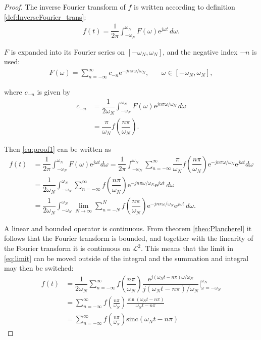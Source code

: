 \begin{proof}
The inverse Fourier transform of $f$ is written according to definition \ref{def:InverseFourier_trans}:
\begin{align} \label{eq:proof1}
f(t) = \dfrac{1}{2\pi} \int_{-\omega_N}^{\omega_N} \! F(\omega)\mathrm{e}^{j\omega t} \, d\omega.
\end{align}

$F$ is expanded into its Fourier series on $[-\omega_N,\omega_N]$, and the negative index $-n$ is used:
\begin{align*}
F(\omega) = \sum_{n=-\infty}^{\infty} c_{-n} \mathrm{e}^{-jn\pi\omega/\omega_N}, \phantom{mm} \omega \in [-\omega_N,\omega_N],
\end{align*}

where $c_{-n}$ is given by
\begin{align*}
c_{-n} &= \dfrac{1}{2\omega_N} \int_{-\omega_N}^{\omega_N} \!F(\omega) \mathrm{e}^{jn\pi\omega/\omega_N} \, d\omega \\
&= \dfrac{\pi}{\omega_N} f \left( \dfrac{n\pi}{\omega_N}\right).
\end{align*}

Then \eqref{eq:proof1} can be written as
\begin{align} \label{eq:limit}
f(t) &= \dfrac{1}{2\pi} \int_{-\omega_N}^{\omega_N} F(\omega) \mathrm{e}^{j\omega t} d\omega = \dfrac{1}{2\pi} \int_{-\omega_N}^{\omega_N} \sum_{n=-\infty}^{\infty} \dfrac{\pi}{\omega_N} f \left( \dfrac{n\pi}{\omega_N}\right) \mathrm{e}^{-jn\pi\omega/\omega_N} \mathrm{e}^{j\omega t} d\omega \nonumber \\
&= \dfrac{1}{2\omega_N} \int_{-\omega_N}^{\omega_N} \! \sum_{n=-\infty}^{\infty} f \left( \dfrac{n\pi}{\omega_N} \right) \mathrm{e}^{-jn\pi\omega/\omega_N} \mathrm{e}^{j\omega t} \, d\omega
\nonumber \\
&= \dfrac{1}{2\omega_N} \int_{-\omega_N}^{\omega_N} \! \lim_{N\to\infty} \sum_{n=-N}^{N} f \left( \dfrac{n\pi}{\omega_N} \right) \mathrm{e}^{-jn\pi\omega/\omega_N} \mathrm{e}^{j\omega t} \, d\omega.
\end{align}

A linear and bounded operator is continuous. From theorem \ref{theo:Plancherel} it follows that the Fourier transform is bounded, and together with the linearity of the Fourier transform it is continuous on $\mathcal{L}^2$. This means that the limit in \eqref{eq:limit} can be moved outside of the integral and the summation and integral may then be switched:
\begin{align*}
f(t) &= \dfrac{1}{2\omega_N} \sum_{n=-\infty}^{\infty} f \left( \dfrac{n\pi}{\omega_N} \right) \dfrac{\mathrm{e}^{j(\omega_N t - n\pi)\omega/\omega_N}}{j(\omega_Nt - n\pi)/\omega_N}\Bigg|_{\omega=-\omega_N}^{\omega_N}
\\
&=\sum_{n=-\infty}^{\infty}f\left(\frac{n\pi}{\omega_N}\right)\frac{\sin(\omega_Nt-n\pi)}{\omega_Nt-n\pi}
\\
&=\sum_{n=-\infty}^{\infty}f\left(\frac{n\pi}{\omega_N}\right)\mathrm{sinc}(\omega_Nt-n\pi)
\end{align*}
\end{proof}

